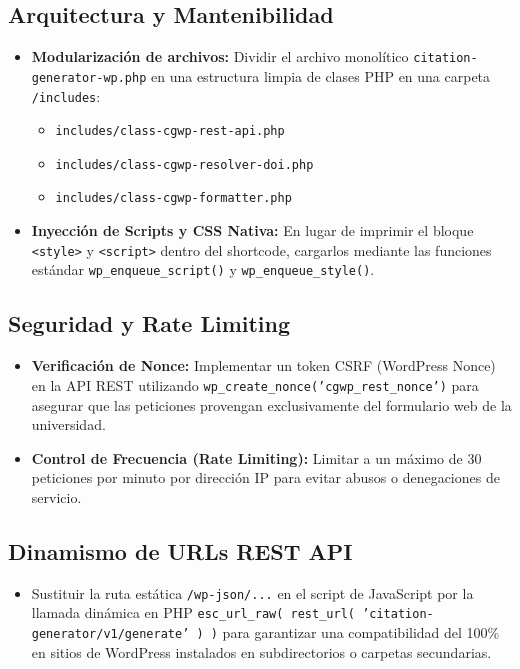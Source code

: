 \documentclass[11pt, a4paper]{article}
\begin{document}
\subsection{Arquitectura y Mantenibilidad}
\begin{itemize}
\item \textbf{Modularización de archivos:} Dividir el archivo monolítico \texttt{citation-generator-wp.php} en una estructura limpia de clases PHP en una carpeta \texttt{/includes}:
\begin{itemize}
\item \texttt{includes/class-cgwp-rest-api.php}
\item \texttt{includes/class-cgwp-resolver-doi.php}
\item \texttt{includes/class-cgwp-formatter.php}
\end{itemize}
\item \textbf{Inyección de Scripts y CSS Nativa:} En lugar de imprimir el bloque \texttt{<style>} y \texttt{<script>} dentro del shortcode, cargarlos mediante las funciones estándar \texttt{wp\_enqueue\_script()} y \texttt{wp\_enqueue\_style()}.
\end{itemize}
\subsection{Seguridad y Rate Limiting}
\begin{itemize}
\item \textbf{Verificación de Nonce:} Implementar un token CSRF (WordPress Nonce) en la API REST utilizando \texttt{wp\_create\_nonce('cgwp\_rest\_nonce')} para asegurar que las peticiones provengan exclusivamente del formulario web de la universidad.
\item \textbf{Control de Frecuencia (Rate Limiting):} Limitar a un máximo de 30 peticiones por minuto por dirección IP para evitar abusos o denegaciones de servicio.
\end{itemize}
\subsection{Dinamismo de URLs REST API}
\begin{itemize}
\item Sustituir la ruta estática \texttt{/wp-json/...} en el script de JavaScript por la llamada dinámica en PHP \texttt{esc\_url\_raw( rest\_url( 'citation-generator/v1/generate' ) )} para garantizar una compatibilidad del 100\% en sitios de WordPress instalados en subdirectorios o carpetas secundarias.
\end{itemize}
\end{document}

